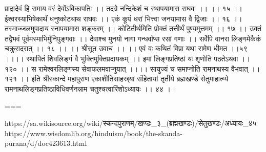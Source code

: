 प्रादादेवं हि रामाय वरं देवोंऽबिकापतिः ।।
तदग्रे नन्दिकेशं च स्थापयामास राघवः ।। ।। १५ ।।
ईश्वरस्याभिषेकार्थं धनुष्कोट्याथ राघवः ।।
एकं कूपं धरां भित्त्वा जनयामास वै द्विजाः ।। १६ ।।
तस्माज्जलमुपादाय स्नापयामास शङ्करम् ।।
कोटितीर्थमिति प्रोक्तं तत्तीर्थं पुण्यमुत्तमम् ।। १७ ।।
उक्तं तद्वैभवं पूर्वमस्माभिर्मुनिपुङ्गवाः ।।
देवाश्च मुनयो नागा गन्धर्वाप्स रसां गणाः ।।
सर्वेपि वानरा लिङ्गमेकैकं चक्रुरादरात् ।। १८ ।।
।। श्रीसूत उवाच ।। ।।
एवं वः कथितं विप्रा यथा रामेण धीमत ।।५९ ।।।।
स्थापितं शिवलिङ्गं वै भुक्तिमुक्तिप्रदायकम् ।।
इमां लिङ्गप्रतिष्ठां यः शृणोति पठतेऽथवा ।। १२० ।।
स रामेश्वरलिङ्गस्य सेवाफलमवाप्नुयात् ।।।।
सायुज्यं च समाप्नोति रामनाथस्य वैभवात् ।। १२१ ।।
इति श्रीस्कान्दे महापुराण एकाशीतिसाहस्र्यां संहितायां तृतीये ब्रह्मखण्डे सेतुमाहात्म्ये रामनाथलिङ्गप्रतिष्ठाविधिवर्णनन्नाम चतुश्चत्वारिंशोऽध्यायः ।। ४४ ।।


===

https://sa.wikisource.org/wiki/स्कन्दपुराणम्/खण्डः_३_(ब्रह्मखण्डः)/सेतुखण्डः/अध्यायः_४५
https://www.wisdomlib.org/hinduism/book/the-skanda-purana/d/doc423613.html

